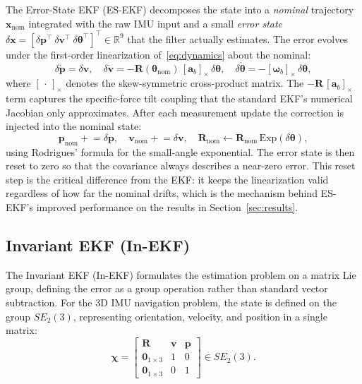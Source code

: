 \documentclass[conference]{IEEEtran}
\begin{document}
The Error-State EKF (ES-EKF) decomposes the state into a \emph{nominal} trajectory $\mathbf{x}_{\text{nom}}$ integrated with the raw IMU input and a small \emph{error state} $\delta\mathbf{x} = [\delta\mathbf{p}^\top\ \delta\mathbf{v}^\top\ \delta\boldsymbol{\theta}^\top]^\top \in \mathbb{R}^9$ that the filter actually estimates. The error evolves under the first-order linearization of~\eqref{eq:dynamics} about the nominal:
\begin{equation}
  \delta\dot{\mathbf{p}} = \delta\mathbf{v}, \quad
  \delta\dot{\mathbf{v}} = -\mathbf{R}(\boldsymbol{\theta}_{\text{nom}})\,[\mathbf{a}_b]_\times\,\delta\boldsymbol{\theta}, \quad
  \delta\dot{\boldsymbol{\theta}} = -[\boldsymbol{\omega}_b]_\times\,\delta\boldsymbol{\theta},
  \label{eq:eserror}
\end{equation}
where $[\,\cdot\,]_\times$ denotes the skew-symmetric cross-product matrix. The $-\mathbf{R}\,[\mathbf{a}_b]_\times$ term captures the specific-force tilt coupling that the standard EKF's numerical Jacobian only approximates. After each measurement update the correction is injected into the nominal state:
\begin{equation}
  \mathbf{p}_{\text{nom}} \mathrel{+}= \delta\mathbf{p}, \quad
  \mathbf{v}_{\text{nom}} \mathrel{+}= \delta\mathbf{v}, \quad
  \mathbf{R}_{\text{nom}} \mathrel{\leftarrow} \mathbf{R}_{\text{nom}}\,\mathrm{Exp}(\delta\boldsymbol{\theta}),
\end{equation}
using Rodrigues' formula for the small-angle exponential. The error state is then reset to zero so that the covariance always describes a near-zero error. This reset step is the critical difference from the EKF: it keeps the linearization valid regardless of how far the nominal drifts, which is the mechanism behind ES-EKF's improved performance on the results in Section~\ref{sec:results}.

\subsection{Invariant EKF (In-EKF)}

The Invariant EKF (In-EKF) formulates the estimation problem on a matrix Lie group, defining the error as a group operation rather than standard vector subtraction. For the 3D IMU navigation problem, the state is defined on the group $SE_2(3)$, representing orientation, velocity, and position in a single matrix:
\begin{equation}
    \boldsymbol{\chi} = 
    \begin{bmatrix}
        \mathbf{R} & \mathbf{v} & \mathbf{p} \\
        \mathbf{0}_{1 \times 3} & 1 & 0 \\
        \mathbf{0}_{1 \times 3} & 0 & 1
    \end{bmatrix} \in SE_2(3).
    \label{eq:inekf_state}
\end{equation}
\end{document}
